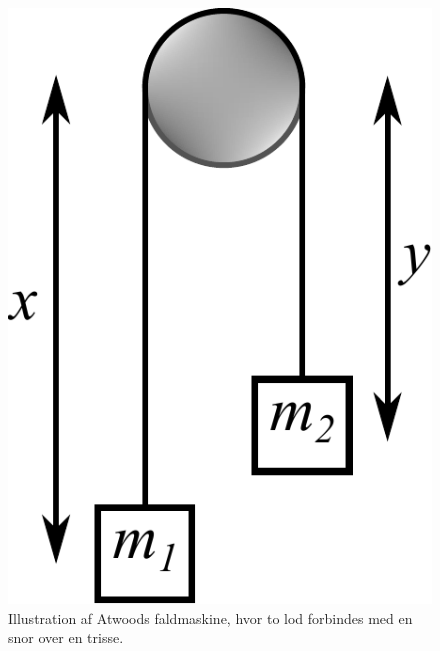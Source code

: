 \begin{figure}[h!]
	\centering
	\includegraphics[width=.65\columnwidth]{Analytisk-Mekanik/Atwood.pdf}
	\caption{Illustration af Atwoods faldmaskine, hvor to lod forbindes med en snor over en trisse.} \label{fig:Atwood}
\end{figure}
%
%
